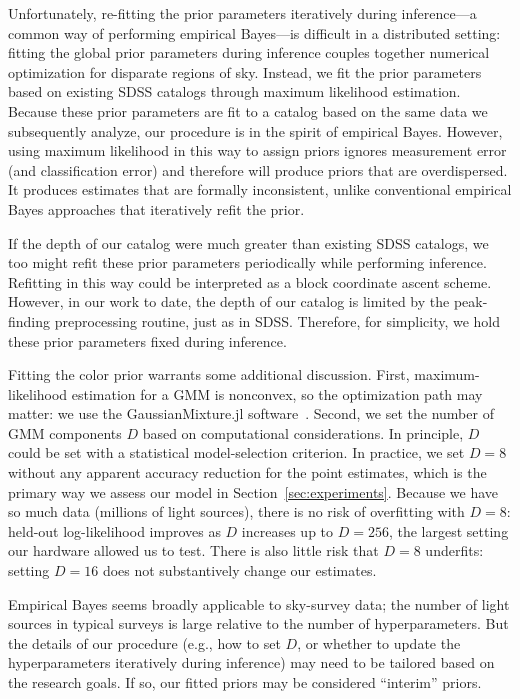 Unfortunately, re-fitting the prior parameters iteratively during inference---a common way of performing empirical Bayes---is difficult in a distributed setting: fitting the global prior parameters during inference couples together numerical optimization for disparate regions of sky.
Instead, we fit the prior parameters based on existing SDSS catalogs through maximum likelihood estimation.
Because these prior parameters are fit to a catalog based on the same data we subsequently analyze, our procedure is in the spirit of empirical Bayes.
However, using maximum likelihood in this way to assign priors ignores measurement error (and classification error) and therefore will produce priors that are  overdispersed. It produces estimates that are formally inconsistent, unlike conventional empirical Bayes approaches that iteratively refit the prior.

If the depth of our catalog were much greater than existing SDSS catalogs, we too might refit these
prior parameters periodically while performing inference.
Refitting in this way could be interpreted as a block coordinate ascent scheme.
However, in our work to date, the depth of our catalog is limited by the peak-finding preprocessing routine, just as in SDSS.
Therefore, for simplicity, we hold these prior parameters fixed during inference.

Fitting the color prior warrants some additional discussion.
First, maximum-likelihood estimation for a GMM is nonconvex, so the optimization path may matter: we use the GaussianMixture.jl software~\citep{gmm}.
Second, we set the number of GMM components $D$ based on computational considerations.
In principle, $D$ could be set with a statistical model-selection criterion.
In practice, we set $D=8$ without any apparent accuracy reduction for the point estimates, which is the primary way we assess our model in Section~\ref{sec:experiments}.
Because we have so much data (millions of light sources), there is no risk of overfitting with $D=8$: held-out log-likelihood improves as $D$ increases up to $D=256$, the largest setting our hardware allowed us to test.
There is also little risk that $D=8$ underfits: setting $D=16$ does not substantively change our estimates.

Empirical Bayes seems broadly applicable to sky-survey data; the number of light sources in typical surveys is large relative to the number of hyperparameters.
But the details of our procedure (e.g., how to set $D$, or whether to update the hyperparameters iteratively during inference) may need to be tailored based on the research goals. If so, our fitted priors may be considered ``interim'' priors.


